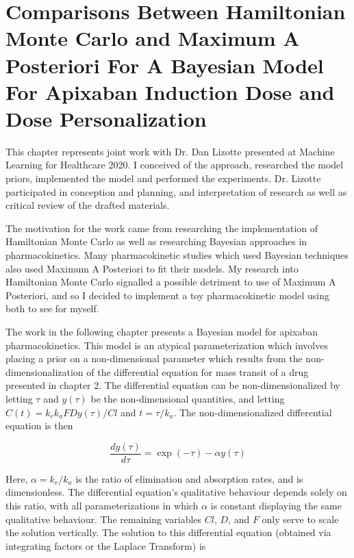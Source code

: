 \chapter[Comparisons Between HMC and MAP for Dose Personalization]{Comparisons Between Hamiltonian Monte Carlo and Maximum A Posteriori For A Bayesian Model For Apixaban Induction Dose and Dose Personalization}

This chapter represents joint work with Dr. Dan Lizotte presented at  Machine Learning for Healthcare 2020.  I conceived of the approach, researched the model priors, implemented the model and performed the experiments. Dr. Lizotte participated in conception and planning, and interpretation of research as well as critical review of the drafted materials.

The motivation for the work came from researching the implementation of Hamiltonian Monte Carlo as well as researching Bayesian approaches in pharmacokinetics.  Many pharmacokinetic studies which used Bayesian techniques also used Maximum A Posteriori to fit their models.  My research into Hamiltonian Monte Carlo signalled a possible detriment to use of Maximum A Posteriori, and so I decided to implement a toy pharmacokinetic model using both to see for myself.

The work in the following chapter presents a Bayesian model for apixaban pharmacokinetics.  This model is an atypical parameterization which involves placing a prior on a non-dimensional parameter which results from the non-dimensionalization of the differential equation for mass transit of a drug presented in chapter 2.  The differential equation can be non-dimensionalized by letting $\tau$ and $y(\tau)$ be the non-dimensional quantities, and letting $C(t) = k_ek_a FD y(\tau) / Cl$ and $t = \tau/k_a$.  The non-dimensionalized differential equation is then

\begin{equation}
	\dfrac{dy(\tau)}{d\tau} = \exp(-\tau) - \alpha y(\tau)
\end{equation}

\noindent Here, $\alpha = k_e / k_a$ is the ratio of elimination and absorption rates, and is dimensionless.  The differential equation's qualitative behaviour depends solely on this ratio, with all parameterizations in which $\alpha$ is constant displaying the same qualitative behaviour.  The remaining variables $Cl$, $D$, and $F$ only serve to scale the solution vertically.  The solution to this differential equation (obtained via integrating factors or the Laplace Transform) is

